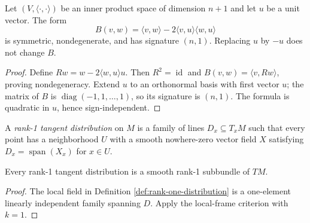\begin{lemma}
\label{lem:lorentz-form-pointwise}
\leanok
{}
Let $(V,\langle\cdot,\cdot\rangle)$ be an inner product space of dimension $n+1$
and let $u$ be a unit vector. The form
\[
B(v,w)=\langle v,w\rangle
 -2\langle v,u\rangle\langle w,u\rangle
\]
is symmetric, nondegenerate, and has signature $(n,1)$. Replacing $u$ by $-u$
does not change $B$.
\end{lemma}

\begin{proof}
\leanok
{}
\sketch Define $Rw=w-2\langle w,u\rangle u$. Then $R^2=\operatorname{id}$ and
$B(v,w)=\langle v,Rw\rangle$, proving nondegeneracy. Extend $u$ to an orthonormal
basis with first vector $u$; the matrix of $B$ is
$\operatorname{diag}(-1,1,\ldots,1)$, so its signature is $(n,1)$. The formula is
quadratic in $u$, hence sign-independent.
\end{proof}

\begin{definition}
\label{def:rank-one-distribution}
\leanok
A \emph{rank-1 tangent distribution} on $M$ is a family of lines
$D_x\subseteq T_xM$ such that every point has a neighborhood $U$ with a smooth
nowhere-zero vector field $X$ satisfying $D_x=\operatorname{span}(X_x)$ for
$x\in U$.
\end{definition}

\begin{proposition}
\label{prop:rank-one-distribution-is-subbundle}
\leanok
{}
Every rank-1 tangent distribution is a smooth rank-1 subbundle of $TM$.
\end{proposition}

\begin{proof}
\leanok
{}
\sketch The local field in Definition \ref{def:rank-one-distribution} is a
one-element linearly independent family spanning $D$. Apply the local-frame
criterion with $k=1$.
\end{proof}

